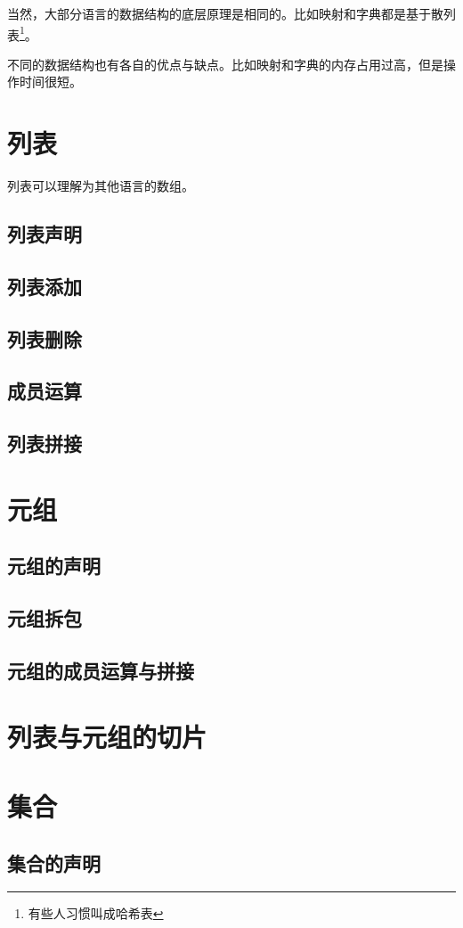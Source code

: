 \documentclass{book}
\begin{document}
当然，大部分语言的数据结构的底层原理是相同的。比如映射和字典都是基于散列表\footnote{有些人习惯叫成哈希表}。


不同的数据结构也有各自的优点与缺点。比如映射和字典的内存占用过高，但是操作时间很短。
\section{列表}
\indent 列表可以理解为其他语言的数组。
\subsection{列表声明}
\subsection{列表添加}
\subsection{列表删除}
\subsection{成员运算}
\subsection{列表拼接}
\section{元组}
\subsection{元组的声明}
\subsection{元组拆包}
\subsection{元组的成员运算与拼接}
\section{列表与元组的切片}
\section{集合}
\subsection{集合的声明}
\end{document}
